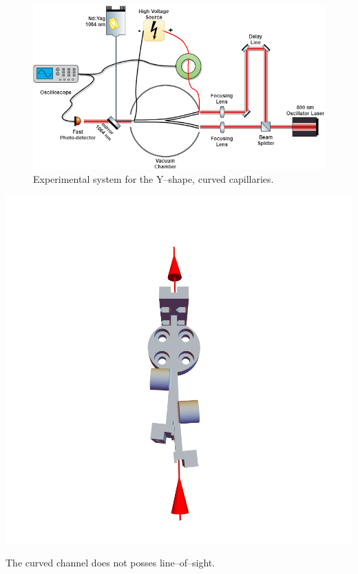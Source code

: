 \documentclass[../main.tex]{subfiles}
\begin{document}
\begin{figure}
    \centering
    \includegraphics[width=\textwidth]{figures/Curved capillaries/system double capillary.png}
    \caption{Experimental system for the Y--shape, curved capillaries.}
    \label{fig:twostage_system}
\end{figure}

\begin{marginfigure}
\includegraphics[width=\marginparwidth]{figures/Curved capillaries/line-of-sight.png}
\caption{The curved channel does not posses line--of--sight.}
\label{fig:lineofsight}
\end{marginfigure}
\end{document}
